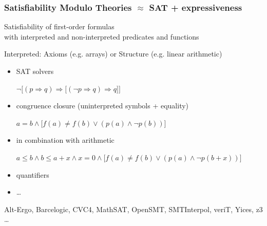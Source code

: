 \documentclass[svgnames,table,mathserif]{beamer}
\begin{document}
\begin{frame}
  \frametitle{Satisfiability Modulo Theories $\approx$ SAT + expressiveness}

  \begin{block}{}
    \center
    Satisfiability of first-order formulas\\
    with interpreted and non-interpreted predicates and functions
  \end{block}

  {\footnotesize Interpreted: Axioms (e.g. arrays) or Structure (e.g. linear arithmetic)}

  \begin{itemize}
  \item SAT solvers\\
    \begin{center}
      $\neg \big[\left(p \Rightarrow q\right) \Rightarrow
      \big[\left(\neg p \Rightarrow q\right) \Rightarrow q\big] \big]$
    \end{center}
  \item congruence closure (uninterpreted symbols + equality)
    \begin{center}
    $a = b \wedge \big[ f(a) \neq f(b) \vee (p(a) \wedge \neg p(b))
    \big]$
    \end{center}
  \item in combination with arithmetic
    \begin{center}
    $a \leq b \wedge b \leq a + x \wedge x = 0 \wedge
      \big[ f(a) \neq f(b) \vee (p(a) \wedge \neg p(b + x)) \big]$
    \end{center}
  \item quantifiers
  \item \dots
  \end{itemize}

  {\footnotesize
    Alt-Ergo, Barcelogic, CVC4, MathSAT, OpenSMT, SMTInterpol,
    veriT, Yices, z3 \dots}

\end{frame}

\end{document}
